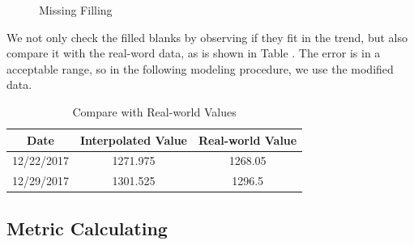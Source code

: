 \documentclass[12pt,a4paper]{article}
\begin{document}
\begin{spacing}{1.2}
\begin{figure}
	\begin{center}
		\caption{Missing Filling}
		\label{fig:fill_missing}
	\end{center}
\end{figure}

We not only check the filled blanks by observing if they fit in the trend, but also compare it with the real-word data, as is shown in Table . The error is in a acceptable range, so in the following modeling procedure, we use the modified data.

\begin{table}[H]
	\renewcommand{\arraystretch}{1.5}
	\caption{Compare with Real-world Values}
	\label{table:fill_comp}
	\begin{center}
		{\footnotesize
			\begin{tabular}{c|c c }
				\toprule
				Date & Interpolated Value & Real-world Value\\
				\midrule
				12/22/2017 & 1271.975 & 1268.05 \\
				12/29/2017 & 1301.525 & 1296.5 \\
				\bottomrule
		\end{tabular}}
	\end{center}	
\end{table}


\subsection{Metric Calculating}


\end{spacing}
\end{document}
